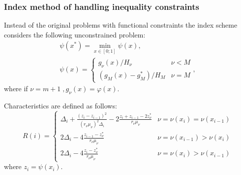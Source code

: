 \documentclass[aspectratio=1610]{beamer}
\begin{document}
\begin{frame}
  \frametitle{Index method of handling inequality constraints}
  Instead of the original problems with functional constraints the index scheme considers the following unconstrained problem:
  \begin{displaymath}
    \begin{array}{lr}
      \psi (x^{*})=\min_{x\in [0;1]}\psi (x), \\
      \psi (x)={\begin{cases}g_{\nu }(x)/H_{\nu }&\nu <M\\(g_{M}(x)-g_{M}^{*})/H_{M}&\nu =M\end{cases}},
    \end{array}
  \end{displaymath}
  where if \(\nu=m+1\;,g_\nu(x)=\varphi(x)\).

  Characteristics are defined as follows:
  \begin{displaymath}
    R(i)={\begin{cases}\Delta _{i}+{\frac {(z_{i}-z_{i-1})^{2}}{(r_{\nu }\mu _{\nu })^{2}\Delta _{i}}}-2{\frac {z_{i}+z_{i-1}-2z_{\nu }^{*}}{r_{\nu }\mu _{\nu }}}&\nu =\nu (x_{i})=\nu (x_{i-1})\\2\Delta _{i}-4{\frac {z_{i-1}-z_{\nu }^{*}}{r_{\nu }\mu _{\nu }}}&\nu =\nu (x_{i-1})>\nu (x_{i})\\2\Delta _{i}-4{\frac {z_{i}-z_{\nu }^{*}}{r_{\nu }\mu _{\nu }}}&\nu =\nu (x_{i})>\nu (x_{i-1})\end{cases}}
  \end{displaymath}
  where \(z_i=\psi(x_i)\).
\end{frame}
\end{document}
